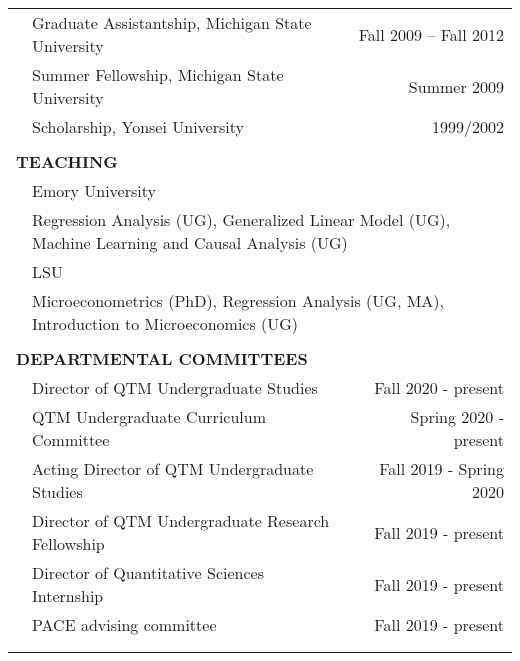 \documentclass[10pt]{article}
\begin{document}
\begin{center}
\begin{tabular}{llllr}
& \multicolumn{3}{l}{Graduate Assistantship, Michigan State University} &
\multicolumn{1}{r}{Fall 2009 -- Fall 2012}\\
& \multicolumn{3}{l}{Summer Fellowship, Michigan State University}& \multicolumn{1}{r}{Summer 2009} \\
& \multicolumn{3}{l}{Scholarship, Yonsei University} &
\multicolumn{1}{r}{1999/2002}\\
\multicolumn{5}{l}{} \\
\multicolumn{5}{l}{{\Large \textbf{T}}\textbf{EACHING}} \vspace{0.1cm}\\
& \multicolumn{4}{l}{Emory University}\vspace{0.1cm}\\
& \multicolumn{4}{l}{\quad Regression Analysis (UG), Generalized Linear Model (UG), Machine Learning and Causal Analysis (UG)}\vspace{0.1cm}\\
& \multicolumn{4}{l}{LSU}\vspace{0.1cm}\\
& \multicolumn{4}{l}{\quad Microeconometrics (PhD), Regression Analysis (UG, MA), Introduction to Microeconomics (UG)}\vspace{0.1cm}\\
\multicolumn{5}{l}{} \\
\multicolumn{5}{l}{{\Large \textbf{D}}\textbf{EPARTMENTAL COMMITTEES}} \vspace{0.1cm}\\
& \multicolumn{3}{l}{Director of QTM Undergraduate Studies}&\multicolumn{1}{r}{Fall 2020 - present}\\
& \multicolumn{3}{l}{QTM Undergraduate Curriculum Committee}&\multicolumn{1}{r}{Spring 2020 - present}\\
& \multicolumn{3}{l}{Acting Director of QTM Undergraduate Studies}&\multicolumn{1}{r}{Fall 2019 - Spring 2020}\\
& \multicolumn{3}{l}{Director of QTM Undergraduate Research Fellowship}&\multicolumn{1}{r}{Fall 2019 - present}\\
& \multicolumn{3}{l}{Director of Quantitative Sciences Internship}&\multicolumn{1}{r}{Fall 2019 - present}\\
& \multicolumn{3}{l}{PACE advising committee}&\multicolumn{1}{r}{Fall 2019 - present}\\
\vspace{0.1cm}\\
\multicolumn{5}{l}{} \\

\end{tabular}
\end{center}
\end{document}

